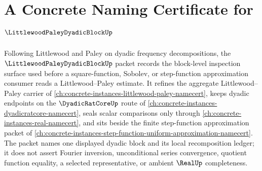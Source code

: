 \chapter{A Concrete Naming Certificate for $\LittlewoodPaleyDyadicBlockUp$}
\label{ch:concrete-instances-littlewood-paley-dyadic-block-namecert}

Following Littlewood and Paley on dyadic frequency decompositions, the $\LittlewoodPaleyDyadicBlockUp$ packet records the block-level inspection surface used before a square-function, Sobolev, or step-function approximation consumer reads a Littlewood--Paley estimate. It refines the aggregate Littlewood--Paley carrier of \autoref{ch:concrete-instances-littlewood-paley-namecert}, keeps dyadic endpoints on the $\DyadicRatCoreUp$ route of \autoref{ch:concrete-instances-dyadicratcore-namecert}, seals scalar comparisons only through \autoref{ch:concrete-instances-real-namecert}, and sits beside the finite step-function approximation packet of \autoref{ch:concrete-instances-step-function-uniform-approximation-namecert}. The packet names one displayed dyadic block and its local recomposition ledger; it does not assert Fourier inversion, unconditional series convergence, quotient function equality, a selected representative, or ambient $\RealUp$ completeness.

